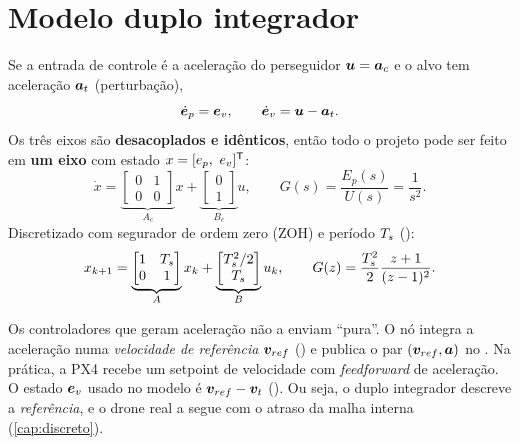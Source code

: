 \section{Modelo duplo integrador}
Se a entrada de controle é a aceleração do perseguidor $\bm{u} = \bm{a}_c$ e o alvo tem
aceleração $\bm{a}_t$ (perturbação),
\begin{equation}
  \dot{\bm{e}}_p = \bm{e}_v,\qquad \dot{\bm{e}}_v = \bm{u} - \bm{a}_t .
\end{equation}
Os três eixos são \textbf{desacoplados e idênticos}, então todo o projeto pode ser
feito em \textbf{um eixo} com estado $x = [e_p,\ e_v]\T$:
\begin{equation}
  \dot x = \underbrace{\begin{bmatrix}0&1\\0&0\end{bmatrix}}_{A_c} x
         + \underbrace{\begin{bmatrix}0\\1\end{bmatrix}}_{B_c} u,
  \qquad
  G(s) = \frac{E_p(s)}{U(s)} = \frac{1}{s^2}.
  \label{eq:di}
\end{equation}
Discretizado com segurador de ordem zero (ZOH) e período $T_s$
():
\begin{equation}
  x_{k+1} = \underbrace{\begin{bmatrix}1&T_s\\0&1\end{bmatrix}}_{A} x_k
          + \underbrace{\begin{bmatrix}T_s^2/2\\ T_s\end{bmatrix}}_{B} u_k,
  \qquad
  G(z) = \frac{T_s^2}{2}\frac{z+1}{(z-1)^2}.
  \label{eq:did}
\end{equation}

\begin{codigo}
Os controladores que geram aceleração não a enviam ``pura''. O nó integra a aceleração
numa \emph{velocidade de referência} $\bm{v}_{ref}$
() e publica o par $(\bm{v}_{ref}, \bm{a})$ no
. Na prática, a PX4 recebe um setpoint de velocidade com
\emph{feedforward} de aceleração. O estado $\bm{e}_v$ usado no modelo é
$\bm{v}_{ref}-\bm{v}_t$ (). Ou seja, o duplo integrador
descreve a \emph{referência}, e o drone real a segue com o atraso da malha interna
(\cref{cap:discreto}).
\end{codigo}

